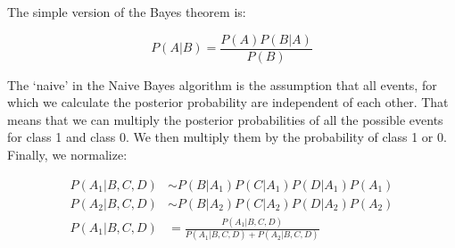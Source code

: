 \documentclass{article}
\begin{document}
The simple version of the Bayes theorem is:

\begin{equation}
  P(A|B) = \frac{P(A) P(B|A)}{P(B)}
\end{equation}

The ‘naive’ in the Naive Bayes algorithm is the assumption that all events, for which we calculate the posterior probability are independent of each other. That means that we can multiply the posterior probabilities of all the possible events for class 1 and class 0. We then multiply them by the probability of class 1 or 0. Finally, we normalize:

\begin{equation}
  \begin{aligned}
    P(A_1|B, C, D) &\sim P(B|A_1) P(C|A_1) P(D|A_1) P(A_1) \\
    P(A_2|B, C, D) &\sim P(B|A_2) P(C|A_2) P(D|A_2) P(A_2) \\
    P(A_1|B, C, D) &= \frac{P(A_1|B, C, D)}{P(A_1|B, C, D) + P(A_2|B, C, D)}
  \end{aligned}
\end{equation}
\end{document}
